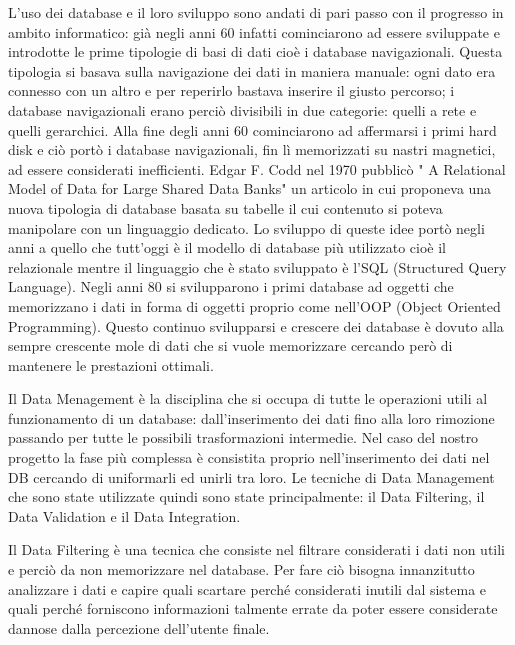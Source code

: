 \documentclass[12pt]{report}
\begin{document}
L'uso dei database e il loro sviluppo sono andati di pari passo con il progresso in ambito informatico: già negli anni 60 infatti cominciarono ad essere sviluppate e introdotte le prime tipologie di basi di dati cioè i database navigazionali. 
Questa tipologia si basava sulla navigazione dei dati in maniera manuale: ogni dato era connesso con un altro e per reperirlo bastava inserire il giusto percorso; i database navigazionali erano perciò divisibili in due categorie: quelli a rete e quelli gerarchici.
Alla fine degli anni 60 cominciarono ad affermarsi i primi hard disk e ciò portò i database navigazionali, fin lì memorizzati su nastri magnetici, ad essere considerati inefficienti. 
Edgar F. Codd nel 1970 pubblicò " A Relational Model of Data for Large Shared Data Banks" un articolo in cui proponeva una nuova tipologia di database basata su tabelle il cui contenuto si poteva manipolare con un linguaggio dedicato.
Lo sviluppo di queste idee portò negli anni a quello che tutt'oggi è il modello di database più utilizzato cioè il relazionale mentre il linguaggio che è stato sviluppato è l'SQL (Structured Query Language).
Negli anni 80 si svilupparono i primi database ad oggetti che memorizzano i dati in forma di oggetti proprio come nell'OOP (Object Oriented Programming).
Questo continuo svilupparsi e crescere dei database è dovuto alla sempre crescente mole di dati che si vuole memorizzare cercando però di mantenere le prestazioni ottimali. 

Il Data Menagement è la disciplina che si occupa di tutte le operazioni utili al funzionamento di un database: dall'inserimento dei dati fino alla loro rimozione passando per tutte le possibili trasformazioni intermedie.
Nel caso del nostro progetto la fase più complessa è consistita proprio nell'inserimento dei dati nel DB cercando di uniformarli ed unirli tra loro. 
Le tecniche di Data Management che sono state utilizzate quindi sono state principalmente: il Data Filtering, il Data Validation e il Data Integration.

\vspace{5mm} %

Il Data Filtering è una tecnica che consiste nel filtrare considerati i dati non utili e perciò da non memorizzare nel database.
Per fare ciò bisogna innanzitutto analizzare i dati e capire quali scartare perché considerati inutili dal sistema e quali perché forniscono informazioni talmente errate da poter essere considerate dannose dalla percezione dell'utente finale.

\vspace{5mm} %
\end{document}
